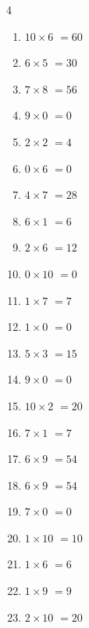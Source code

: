 \begin{multicols}{4}
\begin{enumerate}
  \item $10\times 6$
        $=60$

  \item $6\times 5$
        $=30$

  \item $7\times 8$
        $=56$

  \item $9\times 0$
        $=0$

  \item $2\times 2$
        $=4$

  \item $0\times 6$
        $=0$

  \item $4\times 7$
        $=28$

  \item $6\times 1$
        $=6$

  \item $2\times 6$
        $=12$

  \item $0\times 10$
        $=0$

\columnbreak %

  \item $1\times 7$
        $=7$

  \item $1\times 0$
        $=0$

  \item $5\times 3$
        $=15$

  \item $9\times 0$
        $=0$

  \item $10\times 2$
        $=20$

  \item $7\times 1$
        $=7$

  \item $6\times 9$
        $=54$

  \item $6\times 9$
        $=54$

  \item $7\times 0$
        $=0$

  \item $1\times 10$
        $=10$

  \item $1\times 6$
        $=6$

  \item $1\times 9$
        $=9$

  \item $2\times 10$
        $=20$


\end{enumerate}
\end{multicols}
